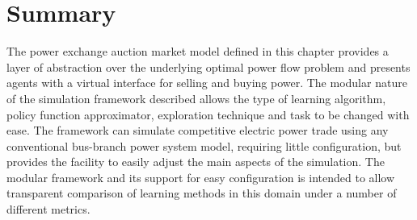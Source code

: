 \section{Summary}
The power exchange auction market model defined in this chapter provides a
layer of abstraction over the underlying optimal power flow problem and
presents agents with a virtual interface for selling
and buying power.  The modular nature of the simulation framework described
allows the type of learning algorithm, policy function approximator,
exploration technique and task to be changed with ease. The framework can
simulate competitive electric power trade using any conventional bus-branch
power system model, requiring little configuration, but provides the facility
to easily adjust the main aspects of the simulation. The modular framework and
its support for easy configuration is intended to allow transparent comparison
of learning methods in this domain under a number of different metrics.
